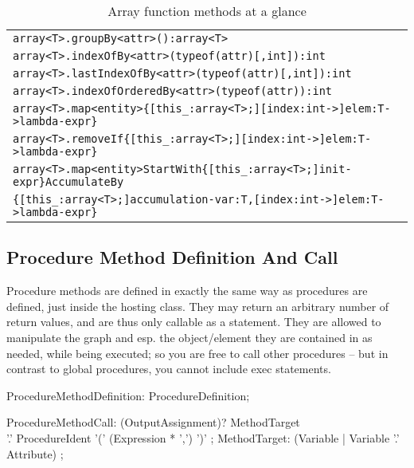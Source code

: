 \begin{table}[htbp]
\begin{tabular}{|l|}
\texttt{array<T>.groupBy<attr>():array<T>}\\
\texttt{array<T>.indexOfBy<attr>(typeof(attr)[,int]):int}\\
\texttt{array<T>.lastIndexOfBy<attr>(typeof(attr)[,int]):int}\\
\texttt{array<T>.indexOfOrderedBy<attr>(typeof(attr)):int}\\
\hline
\verb#array<T>.map<entity>{[this_:array<T>;][index:int->]elem:T->lambda-expr}#\\
\verb#array<T>.removeIf{[this_:array<T>;][index:int->]elem:T->lambda-expr}#\\
\verb#array<T>.map<entity>StartWith{[this_:array<T>;]init-expr}AccumulateBy#\\
\verb#{[this_:array<T>;]accumulation-var:T,[index:int->]elem:T->lambda-expr}#\\
\hline
\end{tabular}
\caption{Array function methods at a glance}
\end{table}

\subsection{Procedure Method Definition And Call}\label{sub:proceduremethods}\label{sec:procmethcall} 

Procedure methods are defined in exactly the same way as procedures are defined, just inside the hosting class.
They may return an arbitrary number of return values, and are thus only callable as a statement.
They are allowed to manipulate the graph and esp. the object/element they are contained in as needed, while being executed;
so you are free to call other procedures -- but in contrast to global procedures, you cannot include exec statements.

\begin{rail} 
  ProcedureMethodDefinition: ProcedureDefinition;
\end{rail}

\begin{rail}
  ProcedureMethodCall: (OutputAssignment)? MethodTarget \\
        '.' ProcedureIdent '(' (Expression * ',') ')' ;
  MethodTarget: (Variable | Variable '.' Attribute) ;
\end{rail}

